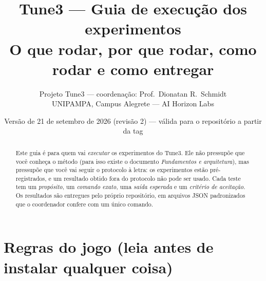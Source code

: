 \newcommand{\docshort}{Guia de execução (alunos)}


\title{\textbf{Tune3 --- Guia de execução dos experimentos}\\[6pt]
\large O que rodar, por que rodar, como rodar e como entregar}
\author{Projeto Tune3 --- coordenação: Prof.\ Dionatan R.\ Schmidt\\ UNIPAMPA, Campus Alegrete --- AI Horizon Labs}
\date{Versão de 21 de setembro de 2026 (revisão 2) --- válida para o repositório a partir da tag }


\maketitle

\begin{abstract}
Este guia é para quem vai \emph{executar} os experimentos do Tune3. Ele não pressupõe que você conheça o método (para isso existe o documento \emph{Fundamentos e arquitetura}), mas pressupõe que você vai seguir o protocolo à letra: os experimentos estão pré-registrados, e um resultado obtido fora do protocolo não pode ser usado. Cada teste tem um \emph{propósito}, um \emph{comando exato}, uma \emph{saída esperada} e um \emph{critério de aceitação}. Os resultados são entregues pelo próprio repositório, em arquivos JSON padronizados que o coordenador confere com um único comando.
\end{abstract}

\tableofcontents
\newpage

\section{Regras do jogo (leia antes de instalar qualquer coisa)}

